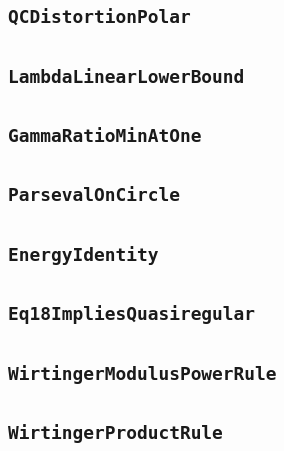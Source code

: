 \documentclass[11pt]{amsart}
\theoremstyle{definition}
\begin{document}
\subsection{\texorpdfstring{\texttt{QCDistortionPolar}}{QCDistortionPolar}}\label{node:QCDistortionPolar}


\subsection{\texorpdfstring{\texttt{LambdaLinearLowerBound}}{LambdaLinearLowerBound}}\label{node:LambdaLinearLowerBound}


\subsection{\texorpdfstring{\texttt{GammaRatioMinAtOne}}{GammaRatioMinAtOne}}\label{node:GammaRatioMinAtOne}


\subsection{\texorpdfstring{\texttt{ParsevalOnCircle}}{ParsevalOnCircle}}\label{node:ParsevalOnCircle}


\subsection{\texorpdfstring{\texttt{EnergyIdentity}}{EnergyIdentity}}\label{node:EnergyIdentity}


\subsection{\texorpdfstring{\texttt{Eq18ImpliesQuasiregular}}{Eq18ImpliesQuasiregular}}\label{node:Eq18ImpliesQuasiregular}


\subsection{\texorpdfstring{\texttt{WirtingerModulusPowerRule}}{WirtingerModulusPowerRule}}\label{node:WirtingerModulusPowerRule}


\subsection{\texorpdfstring{\texttt{WirtingerProductRule}}{WirtingerProductRule}}\label{node:WirtingerProductRule}

\end{document}
